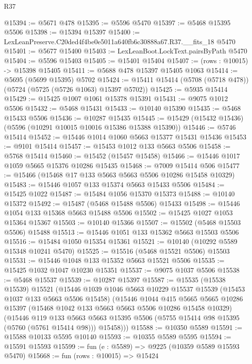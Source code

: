 \begin{lexlean}{R37}
\begin{coremodule}
@15394 := @5671 @478
@15395 := @5596 @5470
@15397 := @5468 @15395 @5506
@15398 := @15394 @15397
@15400 := LexLeanPreserve.C20ded4f4be0e5011a640fb6c30888a67.R37.__fits_18 @5470
@15401 := @5677 @15400
@15403 := LexLeanBoot.LockText.pairsByPath @5470
@15404 := @5596 @15403
@15405 := @15401 @15404
@15407 := (rows : @10015) -> @15398 @15405
@15411 := @5688 @478 @15397 @15405 @1063
@15414 := @5695 (@5699 @15395) @5702
@15424 := @15411 @15414 (@5708 (@5718 @478)) (@5724 (@5725 (@5726 @1063) @15397 @5702))
@15425 := @5935 @15414
@15429 := @15425 @1007 @1061 @15378 @15391
@15431 := @9075 @1012 @5506
@15432 := @5468 @15431
@15433 := @10140 @15390
@15435 := @5468 @15433 @5506
@15436 := @10287 @15435
@15445 := @15429 (@15432 @15436) (@5596 (@10291 @10015 @10016 @15386 @15388 @15390))
@15446 := @5746 @15414
@15452 := @15446 @1014 @1060 @5663 @15377 @15431 @15436
@15453 := @9101 @15414
@15457 := @15453 @1012 @133 @5663 @5506
@15458 := @5768 @15414
@15460 := @15452 (@15457 @15458)
@15466 := @15446 @1017 @1059 @5665 @15376 @10286 @15435
@15468 := @7009 @15414 @506
@15477 := @15466 (@15468 @17 @133 @5663 @5663 @5506 @10286 @15458 @10329)
@15483 := @15446 @1057 @133 @15374 @5663 @15433 @5506
@15484 := @15425 @1022
@15487 := @15484 @1056 @15370 @15373
@15488 := @10140 @15372
@15492 := @15487 (@5468 @15488 @5506) @15433
@15498 := @15446 @1054 @133 @15368 @5663 @15488 @5506
@15502 := @15425 @1027 @1053 @15364 @15367
@15503 := @10140 @15366
@15507 := @15502 (@5468 @15503 @5506) @15488
@15513 := @15446 @1051 @133 @15362 @5663 @15503 @5506
@15516 := @15484 @1050 @15354 @15361
@15521 := @10140 (@10292 @5589 @15348 @10241 @5470)
@15525 := @15516 (@5468 @15521 @5506) @15503
@15531 := @15446 @1048 @133 @15352 @5663 @15521 @5506
@15535 := @15425 @1032 @1047 @10230 @15351
@15537 := @9075 @1037 @5506
@15538 := @5468 @15537
@15539 := @10287 @15397
@15587 := @15535
    (@15538 @15539)
    @15521
    (@15446
      @1039
      @1046
      @5663
      @10229
      @15537
      @15539
      (@15453 @1037 @133 @5663 @5506 @15458)
      (@15446
        @1044
        @415
        @5665
        @5665
        @10286
        @15397
        (@15468 @1042 @133 @5663 @5663 @5506 @10286 @15458 @10329)
        (@15446
          @119
          @133
          @5663
          @5663
          @15395
          @5506
          (@5755 @15414 @98 @15395 (@5760 (@5761 @15414 @98)))
          @15458)))
@15588 := @10350 @5589
@15591 := @15588 @10133 @5595 @10140
@15593 := @10355 @5589 @5595
@15594 := @15591 @15593
@15599 := fun (e : @5589) => @9225 (@10359 @5589 @15593 @5470)
@15668 := fun (rows : @10015) =>
  @15424

\end{coremodule}
\end{lexlean}
